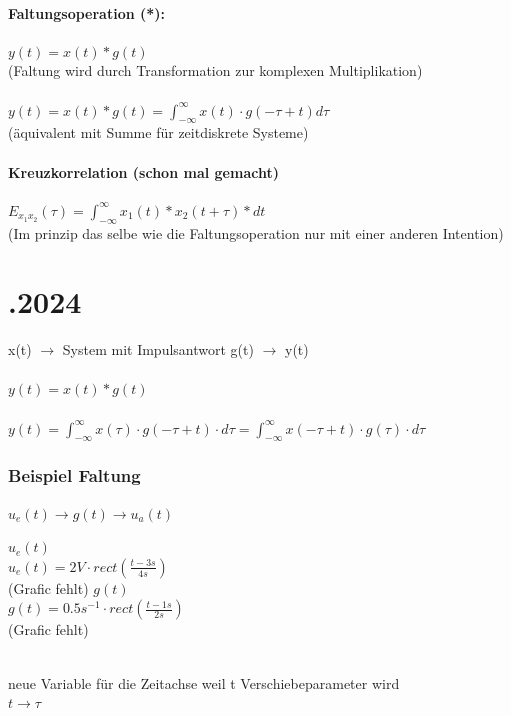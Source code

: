 \documentclass{article}
\begin{document}
\paragraph{Faltungsoperation (*):}
\begin{center}
$ y(t) = x(t) * g(t)$ \\
(Faltung wird durch Transformation zur komplexen Multiplikation) \\
\mbox{} \\
$y(t) = x(t) * g(t) = \int_{-\infty}^{\infty} x(t) \cdot g(-\tau + t) d\tau$ \\
(äquivalent mit Summe für zeitdiskrete Systeme)
\end{center}

\paragraph{Kreuzkorrelation (schon mal gemacht)}
\begin{center}
$E_{x_1x_2}(\tau) = \int_{-\infty}^{\infty} x_1(t) * x_2(t + \tau) * dt$ \\
(Im prinzip das selbe wie die Faltungsoperation nur mit einer anderen Intention)
\end{center}


\newpage
\section*{.2024}
\begin{center}
	x(t) $\to$ System mit Impulsantwort g(t) $\to$ y(t) \\ \mbox{} \\
	$y(t) = x(t) * g(t)$ \\ \mbox{} \\
	$y(t) = \int_{-\infty}^{\infty} x(\tau) \cdot g(-\tau + t) \cdot d\tau = \int_{-\infty}^{\infty} x(-\tau +t) \cdot g(\tau) \cdot d\tau $ 
\end{center}
\subsubsection*{Beispiel Faltung}
$u_e(t) \to g(t) \to u_a(t)$ \\
\begin{paracol}{2}
	$u_e(t)$ \\
	$u_e(t) = 2V \cdot rect(\frac{t-3s}{4s})$ \\
	(Grafic fehlt)
	\switchcolumn
	$g(t)$ \\
	$g(t) = 0.5s^{-1} \cdot rect(\frac{t-1s}{2s})$ \\
	(Grafic fehlt)
\end{paracol}
\mbox{} \\
neue Variable für die Zeitachse weil t Verschiebeparameter wird \\
$t \to \tau$
\end{document}
